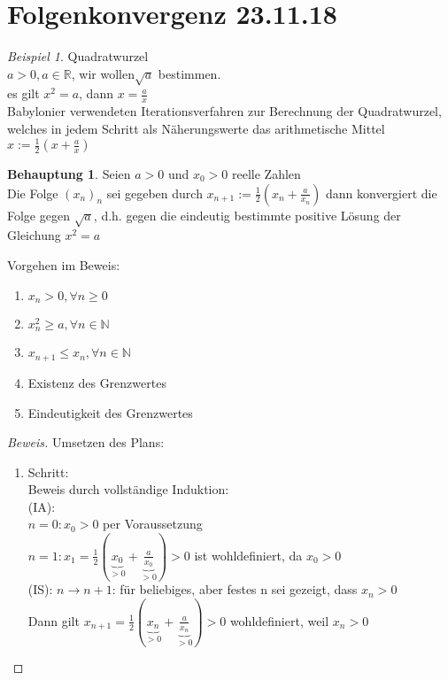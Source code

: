 \documentclass[12pt,a4paper,titlepage]{article} %
\theoremstyle{definition}
\newtheorem*{beh}{Behauptung}
\theoremstyle{remark}
\newtheorem*{bsp}{Beispiel}
\newenvironment{bew}{\begin{proof}[Beweis]}{\end{proof}}
\newcommand{\N}{\mathbb{N}}
\newcommand{\R}{\mathbb{R}}
\begin{document}
	\section{Folgenkonvergenz 23.11.18}
	\begin{bsp}
		Quadratwurzel\\
		\(a > 0, a \in \R\), wir wollen\(\sqrt{a}\) bestimmen.\\
		es gilt \(x^2 = a\), dann \(x = \frac{a}{x}\)\vspace{5mm}\\
		Babylonier verwendeten Iterationsverfahren zur Berechnung der Quadratwurzel, welches in jedem Schritt als Näherungswerte das arithmetische Mittel\vspace{5mm}\\
		\(x := \frac{1}{2}(x+\frac{a}{x})\)
		\begin{beh}
			Seien \(a > 0\) und \(x_0 > 0\) reelle Zahlen\\
			Die Folge \((x_n)_n\) sei gegeben durch \(x_{n+1} := \frac{1}{2}(x_n + \frac{a}{x_n})\) dann konvergiert die Folge gegen \(\sqrt{a}\), d.h. gegen die eindeutig bestimmte positive Lösung der Gleichung \(x^2 = a\)
		\end{beh}		
		Vorgehen im Beweis:
		\begin{enumerate}
			\item \(x_n > 0, \forall n \geq 0\)
			\item \(x_n^2 \geq a, \forall n \in \N\)
			\item \(x_{n+1} \leq x_n, \forall n \in \N\)
			\item Existenz des Grenzwertes
			\item Eindeutigkeit des Grenzwertes
		\end{enumerate}
		\begin{bew}
			Umsetzen des Plans:\\
			\begin{enumerate}				
				\item Schritt:\\
					Beweis durch vollständige Induktion:\\
					(IA):\\
					\(n=0: x_0 > 0\) per Voraussetzung\\
					\(n=1: x_1 = \frac{1}{2}(\underbrace{x_0}_{>0} + \underbrace{\frac{a}{x_0}}_{>0}) > 0\) ist wohldefiniert, da \(x_0 > 0\)\\
					(IS): \(n \rightarrow n+1\): für beliebiges, aber festes n sei gezeigt, dass \(x_n > 0\)\\
					Dann gilt \(x_{n+1} = \frac{1}{2}(\underbrace{x_n}_{>0} + \underbrace{\frac{a}{x_n}}_{>0}) > 0\) wohldefiniert, weil \(x_n > 0\)\\

\end{enumerate}
\end{bew}
\end{bsp}
\end{document}
